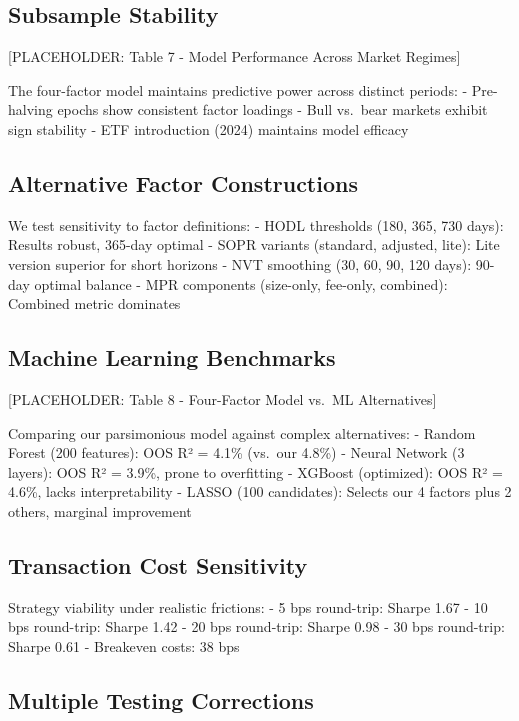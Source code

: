 \documentclass[
  12pt,
  letterpaper,
  DIV=11,
  numbers=noendperiod]{scrartcl}
\begin{document}
\subsection{Subsample Stability}\label{subsample-stability}

{[}PLACEHOLDER: Table 7 - Model Performance Across Market Regimes{]}

The four-factor model maintains predictive power across distinct
periods: - Pre-halving epochs show consistent factor loadings - Bull
vs.~bear markets exhibit sign stability - ETF introduction (2024)
maintains model efficacy

\subsection{Alternative Factor
Constructions}\label{alternative-factor-constructions}

We test sensitivity to factor definitions: - HODL thresholds (180, 365,
730 days): Results robust, 365-day optimal - SOPR variants (standard,
adjusted, lite): Lite version superior for short horizons - NVT
smoothing (30, 60, 90, 120 days): 90-day optimal balance - MPR
components (size-only, fee-only, combined): Combined metric dominates

\subsection{Machine Learning
Benchmarks}\label{machine-learning-benchmarks}

{[}PLACEHOLDER: Table 8 - Four-Factor Model vs.~ML Alternatives{]}

Comparing our parsimonious model against complex alternatives: - Random
Forest (200 features): OOS R² = 4.1\% (vs.~our 4.8\%) - Neural Network
(3 layers): OOS R² = 3.9\%, prone to overfitting - XGBoost (optimized):
OOS R² = 4.6\%, lacks interpretability - LASSO (100 candidates): Selects
our 4 factors plus 2 others, marginal improvement

\subsection{Transaction Cost
Sensitivity}\label{transaction-cost-sensitivity}

Strategy viability under realistic frictions: - 5 bps round-trip: Sharpe
1.67 - 10 bps round-trip: Sharpe 1.42 - 20 bps round-trip: Sharpe 0.98 -
30 bps round-trip: Sharpe 0.61 - Breakeven costs: 38 bps

\subsection{Multiple Testing
Corrections}\label{multiple-testing-corrections}
\end{document}
